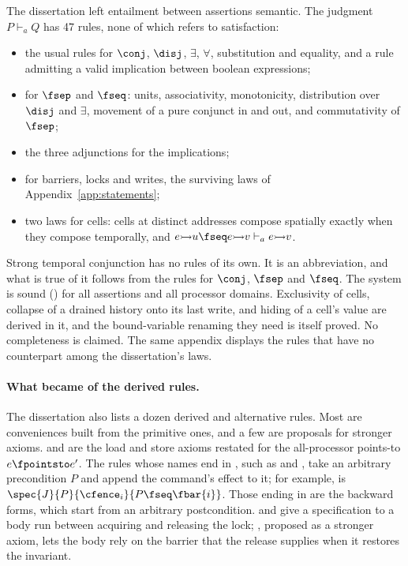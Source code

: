 The dissertation left entailment between assertions semantic. The judgment
$P \vdash_a Q$ has 47 rules, none of which refers to satisfaction:
\begin{itemize}[nosep]
  \item the usual rules for $\conj$, $\disj$, $\exists$, $\forall$,
        substitution and equality, and a rule admitting a valid implication
        between boolean expressions;
  \item for $\fsep$ and $\fseq$: units, associativity, monotonicity,
        distribution over $\disj$ and $\exists$, movement of a pure
        conjunct in and out, and commutativity of $\fsep$;
  \item the three adjunctions for the implications;
  \item for barriers, locks and writes, the surviving laws of
        Appendix~\ref{app:statements};
  \item two laws for cells: cells at distinct addresses compose spatially
        exactly when they compose temporally, and
        $e \fcell u \fseq e \fcell v \vdash_a e \fcell v$.
\end{itemize}
Strong temporal conjunction has no rules of its own. It is an abbreviation,
and what is true of it follows from the rules for $\conj$, $\fsep$ and
$\fseq$. The system is sound () for all
assertions and all processor domains. Exclusivity of cells, collapse of a
drained history onto its last write, and hiding of a cell's value are
derived in it, and the bound-variable renaming they need is itself proved. No completeness is claimed.
The same appendix displays the rules that have no counterpart among the
dissertation's laws.

\paragraph{What became of the derived rules.}
The dissertation also lists a dozen derived and alternative rules. Most
are conveniences built from the primitive ones, and a few are proposals
for stronger axioms.  and
 are the load and store axioms restated for the all-processor
points-to $e \fpointsto e'$. The rules whose names end in , such as
 and , take an arbitrary precondition $P$ and append
the command's effect to it; for example,  is
$\spec{J}{P}{\cfence_i}{P \fseq \fbar{i}}$. Those ending in  are the
backward forms, which start from an arbitrary postcondition.  and  give a specification to a body run between
acquiring and releasing the lock; , proposed as a stronger
axiom, lets the body rely on the barrier that the release supplies when it
restores the invariant.

